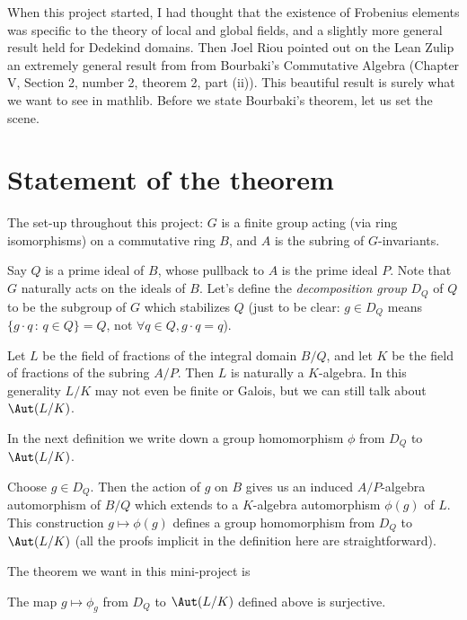 When this project started, I had thought that the existence of Frobenius elements was
specific to the theory of local and global fields, and a slightly more general result
held for Dedekind domains. Then Joel Riou pointed out on the Lean Zulip
an extremely general result from from Bourbaki's Commutative Algebra
(Chapter V, Section 2, number 2, theorem 2, part (ii)). This beautiful
result is surely what we want to see in mathlib. Before we state Bourbaki's
theorem, let us set the scene.

\section{Statement of the theorem}

The set-up throughout this project:
$G$ is a finite group acting (via ring isomorphisms) on a commutative ring $B$,
and $A$ is the subring of $G$-invariants.

Say $Q$ is a prime ideal of $B$, whose pullback to $A$ is the prime ideal $P$.
Note that $G$ naturally acts on the ideals of $B$. Let's define the
\emph{decomposition group} $D_Q$ of $Q$ to be the subgroup of $G$ which
stabilizes $Q$ (just to be clear: $g\in D_Q$ means
$\{g\cdot q\, :\, q \in Q\}=Q$, not $\forall q\in Q, g\cdot q=q$).

Let $L$ be the field of fractions of the integral domain $B/Q$, and let $K$ be the
field of fractions of the subring $A/P$. Then $L$ is naturally a $K$-algebra.
In this generality $L/K$ may not even be finite or Galois, but we can still talk about
$\Aut(L/K)$.

In the next definition we write down a group homomorphism $\phi$ from $D_Q$ to $\Aut(L/K)$.

\begin{definition}
  \label{IsFractionRing.stabilizerHom}
  Choose $g\in D_Q$. Then the action of $g$ on $B$ gives us an induced
  $A/P$-algebra automorphism of $B/Q$ which extends to a $K$-algebra automorphism $\phi(g)$ of $L$.
  This construction $g\mapsto \phi(g)$ defines a group homomorphism from $D_Q$
  to $\Aut(L/K)$ (all the proofs implicit in the definition here are straightforward).
  \mathlibok
\end{definition}

The theorem we want in this mini-project is
\begin{theorem}
  \label{IsFractionRing.stabilizerHom_surjective}
  \mathlibok
  The map $g\mapsto \phi_g$ from $D_Q$ to $\Aut(L/K)$ defined above is surjective.
\end{theorem}

